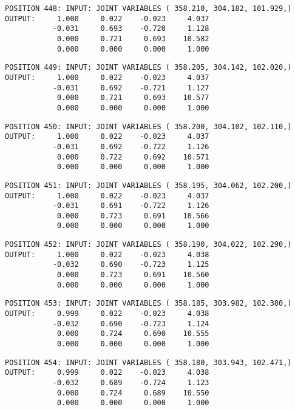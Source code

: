 \begin{verbatim}
POSITION 448: INPUT: JOINT VARIABLES ( 358.210, 304.182, 101.929,)
OUTPUT:     1.000     0.022    -0.023     4.037
           -0.031     0.693    -0.720     1.128
            0.000     0.721     0.693    10.582
            0.000     0.000     0.000     1.000
\end{verbatim} \pagebreak[1]\begin{verbatim}
POSITION 449: INPUT: JOINT VARIABLES ( 358.205, 304.142, 102.020,)
OUTPUT:     1.000     0.022    -0.023     4.037
           -0.031     0.692    -0.721     1.127
            0.000     0.721     0.693    10.577
            0.000     0.000     0.000     1.000
\end{verbatim} \pagebreak[1]\begin{verbatim}
POSITION 450: INPUT: JOINT VARIABLES ( 358.200, 304.102, 102.110,)
OUTPUT:     1.000     0.022    -0.023     4.037
           -0.031     0.692    -0.722     1.126
            0.000     0.722     0.692    10.571
            0.000     0.000     0.000     1.000
\end{verbatim} \pagebreak[1]\begin{verbatim}
POSITION 451: INPUT: JOINT VARIABLES ( 358.195, 304.062, 102.200,)
OUTPUT:     1.000     0.022    -0.023     4.037
           -0.031     0.691    -0.722     1.126
            0.000     0.723     0.691    10.566
            0.000     0.000     0.000     1.000
\end{verbatim} \pagebreak[1]\begin{verbatim}
POSITION 452: INPUT: JOINT VARIABLES ( 358.190, 304.022, 102.290,)
OUTPUT:     1.000     0.022    -0.023     4.038
           -0.032     0.690    -0.723     1.125
            0.000     0.723     0.691    10.560
            0.000     0.000     0.000     1.000
\end{verbatim} \pagebreak[1]\begin{verbatim}
POSITION 453: INPUT: JOINT VARIABLES ( 358.185, 303.982, 102.380,)
OUTPUT:     0.999     0.022    -0.023     4.038
           -0.032     0.690    -0.723     1.124
            0.000     0.724     0.690    10.555
            0.000     0.000     0.000     1.000
\end{verbatim} \pagebreak[1]\begin{verbatim}
POSITION 454: INPUT: JOINT VARIABLES ( 358.180, 303.943, 102.471,)
OUTPUT:     0.999     0.022    -0.023     4.038
           -0.032     0.689    -0.724     1.123
            0.000     0.724     0.689    10.550
            0.000     0.000     0.000     1.000
\end{verbatim} \pagebreak[1]\begin{verbatim}

\end{verbatim}
